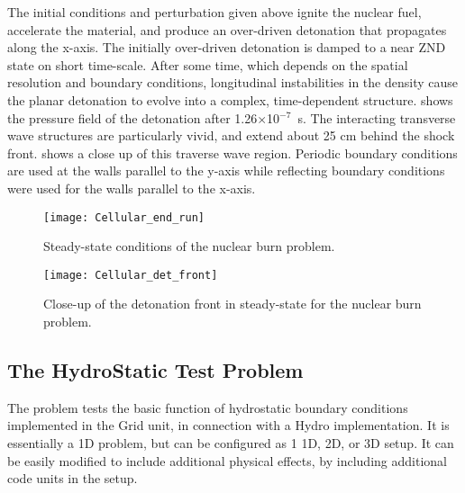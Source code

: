
The initial conditions and perturbation given above ignite the nuclear
fuel, accelerate the material, and produce an over-driven detonation
that propagates along the x-axis.  The initially over-driven
detonation is damped to a near ZND state on short time-scale.  After
some time, which depends on the spatial resolution and boundary
conditions, longitudinal instabilities in the density cause the planar
detonation to evolve into a complex, time-dependent structure.  shows the pressure field of the detonation after
\hbox{1.26$\times$10$^{-7}$ s}.  The interacting transverse wave
structures are particularly vivid, and extend about 25 cm behind the
shock front.   shows a close up of this traverse
wave region.  Periodic boundary conditions are used at the walls parallel to
the y-axis while reflecting boundary conditions were used for the walls
parallel to the x-axis.

\begin{figure}
\begin{center}
{\leavevmode\texttt{[image: Cellular\_end\_run]}}
\end{center}
\caption{\label{Fig:end_run} Steady-state conditions of the 
nuclear burn problem.}
\end{figure}


\begin{figure}
\begin{center}
{\leavevmode\texttt{[image: Cellular\_det\_front]}}
\end{center}
\caption{\label{Fig:det_front} Close-up of the detonation front in steady-state for
the  nuclear burn problem.}
\end{figure}

\subsection{The HydroStatic Test Problem}
\label{Sec:HydroStatic}
The  problem tests the basic function of
hydrostatic boundary conditions implemented in the
\unit{Grid} unit, in connection with a \unit{Hydro} implementation.
It is essentially a 1D problem, but can
be configured as 1 1D, 2D, or 3D setup.
It can be easily modified to include additional physical effects,
by including additional code units in the setup.


